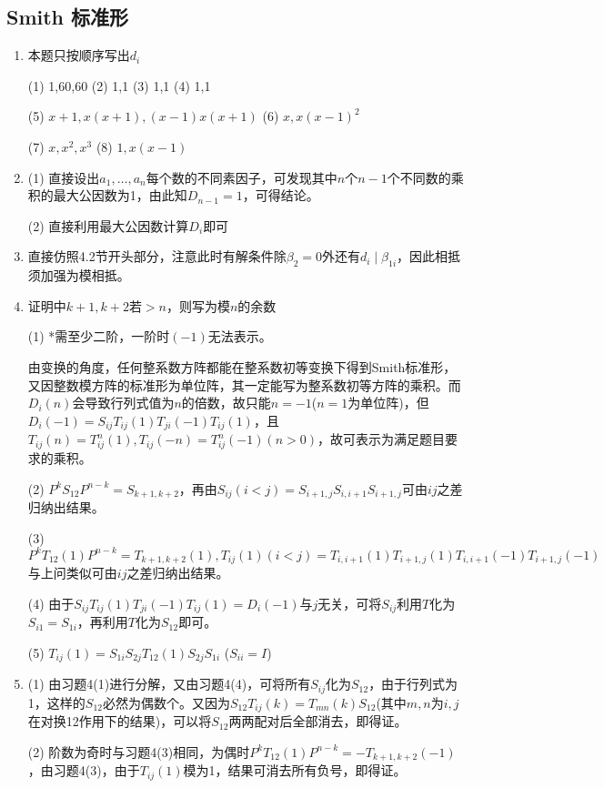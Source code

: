 \documentclass[a4paper,UTF8,fontset=windows]{ctexart}
\begin{document}
\subsection{Smith 标准形}
\begin{enumerate}
\item 
本题只按顺序写出$d_i$

(1) 1,60,60 (2) 1,1 (3) 1,1 (4) 1,1

(5) $x+1,x(x+1),(x-1)x(x+1)$ (6) $x,x(x-1)^2$

(7) $x,x^2,x^3$ (8) $1,x(x-1)$

\item
(1) 直接设出$a_1,\dots,a_n$每个数的不同素因子，可发现其中$n$个$n-1$个不同数的乘积的最大公因数为1，由此知$D_{n-1} = 1$，可得结论。

(2) 直接利用最大公因数计算$D_i$即可

\item
直接仿照4.2节开头部分，注意此时有解条件除$\beta_2=0$外还有$d_i\mid\beta_{1i}$，因此相抵须加强为模相抵。

\item
证明中$k+1,k+2$若$>n$，则写为模$n$的余数
	
(1) *需至少二阶，一阶时$(-1)$无法表示。

由变换的角度，任何整系数方阵都能在整系数初等变换下得到Smith标准形，又因整数模方阵的标准形为单位阵，其一定能写为整系数初等方阵的乘积。而$D_i(n)$会导致行列式值为$n$的倍数，故只能$n=-1$($n=1$为单位阵)，但$D_i(-1)=S_{ij}T_{ij}(1)T_{ji}(-1)T_{ij}(1)$，且$T_{ij}(n)=T_{ij}^n(1),T_{ij}(-n)=T_{ij}^n(-1) (n>0)$，故可表示为满足题目要求的乘积。

(2) $P^kS_{12}P^{n-k}=S_{k+1,k+2}$，再由$S_{ij} (i<j)=S_{i+1,j}S_{i,i+1}S_{i+1,j}$可由$ij$之差归纳出结果。

(3) $P^kT_{12}(1)P^{n-k}=T_{k+1,k+2}(1),T_{ij}(1) (i<j)=T_{i,i+1}(1)T_{i+1,j}(1)T_{i,i+1}(-1)T_{i+1,j}(-1)$与上问类似可由$ij$之差归纳出结果。

(4) 由于$S_{ij}T_{ij}(1)T_{ji}(-1)T_{ij}(1)=D_i(-1)$与$j$无关，可将$S_{ij}$利用$T$化为$S_{i1}=S_{1i}$，再利用$T$化为$S_{12}$即可。

(5) $T_{ij}(1)=S_{1i}S_{2j}T_{12}(1)S_{2j}S_{1i}$ ($S_{ii}=I$)

\item
(1) 由习题4(1)进行分解，又由习题4(4)，可将所有$S_{ij}$化为$S_{12}$，由于行列式为1，这样的$S_{12}$必然为偶数个。又因为$S_{12}T_{ij}(k)=T_{mn}(k)S_{12}$(其中$m,n$为$i,j$在对换12作用下的结果)，可以将$S_{12}$两两配对后全部消去，即得证。

(2) 阶数为奇时与习题4(3)相同，为偶时$P^kT_{12}(1)P^{n-k}=-T_{k+1,k+2}(-1)$，由习题4(3)，由于$T_{ij}(1)$模为1，结果可消去所有负号，即得证。


\end{enumerate}
\end{document}
